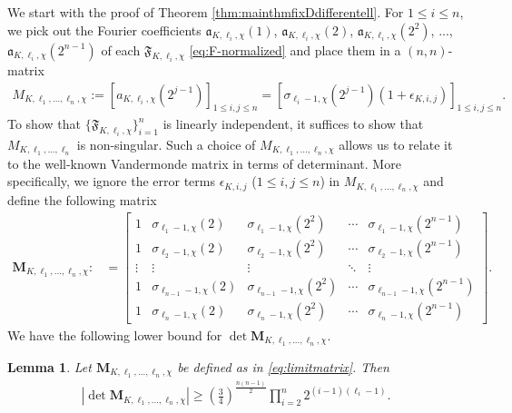 \documentclass[11pt,letterpaper,reqno]{amsart}
\numberwithin{figure}{section}
\numberwithin{table}{section}
\theoremstyle{definition}
\theoremstyle{plain}
\newtheorem{lemma}[theorem]{Lemma}
\theoremstyle{definition}
\theoremstyle{definition}
\theoremstyle{remark}
\numberwithin{equation}{section}
\theoremstyle{remark}
\begin{document}
We start with the proof of Theorem \ref{thm:mainthmfixDdifferentell}. For $1\leq i\leq n$, we pick out the Fourier coefficients $\mathfrak{a}_{K,\ell_i,\chi}(1)$, $\mathfrak{a}_{K,\ell_i,\chi}(2)$, $\mathfrak{a}_{K,\ell_i,\chi}(2^2)$, $...$, $\mathfrak{a}_{K,\ell_i,\chi}(2^{n-1})$ of each $\mathfrak{F}_{K,\ell_i,\chi}$ \eqref{eq:F-normalized}  and place them in a $(n,n)$-matrix
\begin{align}
    M_{K,\ell_1,...,\ell_n,\chi}:=\left[a_{K,\ell_i,\chi}(2^{j-1})\right]_{1\leq i,j\leq n}=\left[\sigma_{\ell_i-1,\chi}(2^{j-1})(1+\epsilon_{K,i,j})\right]_{1\leq i,j\leq n}.\label{eq:matrix1}
\end{align}
To show that $\{\mathfrak{F}_{K,\ell_i,\chi}\}_{i=1}^n$ is linearly independent, it suffices to show that $M_{K,\ell_1,...,\ell_n}$ is non-singular. Such a choice of $M_{K,\ell_1,...,\ell_n,\chi}$ allows us to relate it to the well-known  Vandermonde  matrix in terms of determinant. More specifically, we  ignore the error terms $\epsilon_{K,i,j}$ ($1\leq i,j\leq n$) in  $M_{K,\ell_1,...,\ell_n,\chi}$ and define the following matrix
\begin{align}
    \mathbf{M}_{K,\ell_1,...,\ell_n,\chi}:&=\begin{bmatrix}
        1 & \sigma_{\ell_1-1,\chi}(2) & \sigma_{\ell_1-1,\chi}(2^2) & \cdots & \sigma_{\ell_1-1,\chi}(2^{n-1})\\
        1 &  \sigma_{\ell_2-1,\chi}(2) &  \sigma_{\ell_2-1,\chi}(2^2) & \cdots &  \sigma_{\ell_2-1,\chi}(2^{n-1})\\
        \vdots & \vdots & \vdots & \ddots & \vdots\\
        1 & \sigma_{\ell_{n-1}-1,\chi}(2) & \sigma_{\ell_{n-1}-1,\chi}(2^2) & \cdots & \sigma_{\ell_{n-1}-1,\chi}(2^{n-1})\\ 
        1 & \sigma_{\ell_n-1,\chi}(2) & \sigma_{\ell_n-1,\chi}(2^2) & \cdots & \sigma_{\ell_n-1,\chi}(2^{n-1})
    \end{bmatrix}.\label{eq:limitmatrix}
\end{align}
We have the following lower bound for $\det \mathbf{M}_{K,\ell_1,...,\ell_n,\chi}$.
\begin{lemma}\label{lem:lowerboundoflimitmatrix}
   Let $\mathbf{M}_{K,\ell_1,...,\ell_n,\chi}$ be defined as in \eqref{eq:limitmatrix}. Then 
   \begin{align*}
\left|\det \mathbf{M}_{K,\ell_1,...,\ell_n,\chi}\right|\geq\left(\frac{3}{4}\right)^{\frac{n(n-1)}{2}}\prod_{i=2}^n2^{(i-1)(\ell_i-1)}.
   \end{align*}
\end{lemma}
\end{document}
